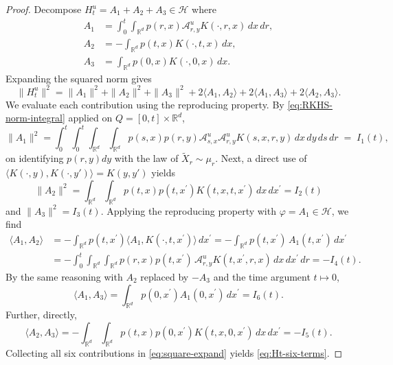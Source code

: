 \documentclass[11pt,leqno]{article}
\theoremstyle{plain}
\theoremstyle{remark}
\theoremstyle{definition}
\numberwithin{equation}{section}
\numberwithin{figure}{section}
\numberwithin{table}{section}
\begin{document}
\begin{proof}
Decompose $H_t^u=A_1+A_2+A_3\in\mathcal{H}$ where
\begin{equation}\label{eq:H-split}
\begin{aligned}
 A_1 &= \int_0^t\!\!\int_{\mathbb{R}^d}p(r,x)\mathcal{A}^u_{r,y}K(\cdot,r,x)\,dx\,dr, \\
 A_2 &= - \int_{\mathbb{R}^d}p(t,x)K(\cdot,t,x)\,dx, \\ 
 A_3 &= \int_{\mathbb{R}^d}p(0,x)K(\cdot,0,x)\,dx. 
\end{aligned}
\end{equation}
Expanding the squared norm gives 
\begin{equation}\label{eq:square-expand}
 \|H_t^u\|^2 = \|A_1\|^2 + \|A_2\|^2 + \|A_3\|^2
 + 2\langle A_1,A_2\rangle + 2\langle A_1,A_3\rangle + 2\langle A_2,A_3\rangle.
\end{equation}
We evaluate each contribution using the reproducing property. 
By \eqref{eq:RKHS-norm-integral}
applied on $Q=[0,t]\times\mathbb{R}^d$,
\[
 \|A_1\|^2
 = \int_0^t\!\!\int_0^t\!\!\int_{\mathbb{R}^d}\!\!\int_{\mathbb{R}^d}
 p(s,x)p(r,y)\mathcal{A}^u_{s,x}\mathcal{A}^u_{r,y}K(s,x,r,y)\,dx\,dy\,ds\,dr
 \;=\; I_1(t),
\]
on identifying $p(r,y)dy$ with the law of $\tilde{X}_r\sim\mu_r$.
Next, a direct use of
$\langle K(\cdot,y),K(\cdot,y')\rangle  = K(y,y')$ yields
\[
 \|A_2\|^2 = \int_{\mathbb{R}^d}\int_{\mathbb{R}^d} p(t,x)p(t,x^{\prime})K(t,x,t,x^{\prime})\,dx\,dx^{\prime} = I_2(t)
\]
and $\|A_3\|^2 = I_3(t)$.  Applying the reproducing
property with $\varphi=A_1\in\mathcal{H}$, we find 
\begin{align*}
 \langle A_1,A_2\rangle
 &= -\int_{\mathbb{R}^d} p(t,x^{\prime})\langle A_1,K(\cdot,t,x^{\prime})\rangle\,dx^{\prime}
  = -\int_{\mathbb{R}^d} p(t,x^{\prime})\,A_1(t,x^{\prime})\,dx^{\prime}\\
 &= -\int_0^t\int_{\mathbb{R}^d}\int_{\mathbb{R}^d} p(r,x)p(t,x^{\prime})\,
      \mathcal{A}^u_{r,y}K(t,x^{\prime},r,x)\,dx\,dx^{\prime}\,dr
   = -I_4(t).
\end{align*}
By the same reasoning with $A_2$ replaced by $-A_3$ and the time argument $t\mapsto 0$,
\[
 \langle A_1,A_3\rangle
 = \int_{\mathbb{R}^d} p(0,x^{\prime})A_1(0,x^{\prime})\,dx^{\prime}
 = I_6(t).
\]
Further, directly,
\[
 \langle A_2,A_3\rangle
 = - \int_{\mathbb{R}^d}\int_{\mathbb{R}^d} p(t,x)p(0,x^{\prime})K(t,x,0,x^{\prime})\,dx\,dx^{\prime}
 = -I_5(t).
\]
Collecting all six contributions in \eqref{eq:square-expand} yields
\eqref{eq:Ht-six-terms}.
\end{proof}
\end{document}
